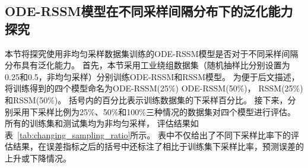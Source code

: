 \subsection{ODE-RSSM模型在不同采样间隔分布下的泛化能力探究}
本节将探究使用非均匀采样数据集训练的ODE-RSSM模型是否对于不同采样间隔分布具有泛化能力。
首先，本节采用工业绕组数据集（随机抽样比分别设置为0.25和0.5，非均匀采样）分别训练ODE-RSSM和RSSM模型。
为便于后文描述，将训练得到的四个模型命名为ODE-RSSM(25\%) ODE-RSSM(50\%)， RSSM(25\%)和RSSM(50\%)。
括号内的百分比表示训练数据集的下采样百分比。
接下来，分别采用下采样比例为25\%、50\%和100\%三种情况的数据集对四个模型进行评估。
所有的训练集和测试集均为非均匀采样，
评估结果如表~\ref{tab:changing_sampling_ratio}所示。
表中不仅给出了不同下采样比率下的评估结果，在误差指标之后的括号中还标注了相比于训练集下采样比率，预测误差的上升或下降情况。
